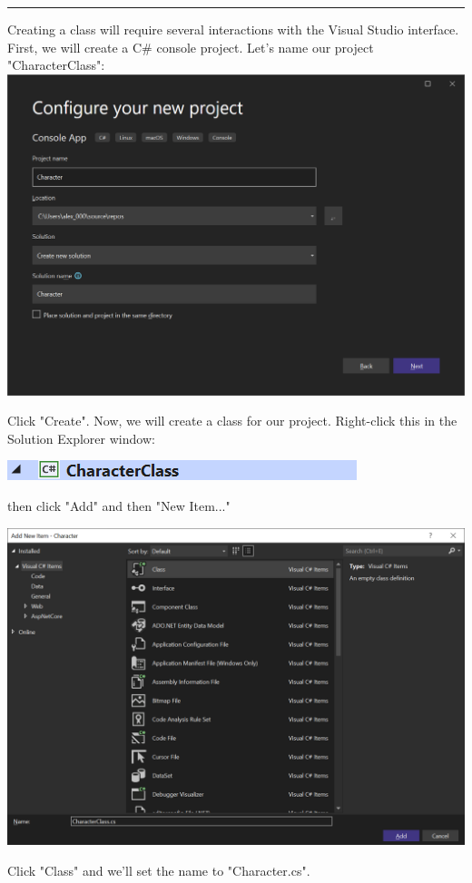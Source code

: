 \documentclass[oneside, openany] {book}
\begin{document}
\noindent\rule{12cm}{0.4pt}


Creating a class will require several interactions with the Visual Studio interface. First, we will create a C\# console project. Let's name our project "CharacterClass":
\includegraphics[scale = 0.4]{CharacterClass}

Click "Create". Now, we will create a class for our project. Right-click this in the Solution Explorer window:

\includegraphics{Character}

then click "Add" and then "New Item..."

\includegraphics[scale=0.6]{CharacterClassCreator}

Click "Class" and we'll set the name to "Character.cs".
\end{document}
